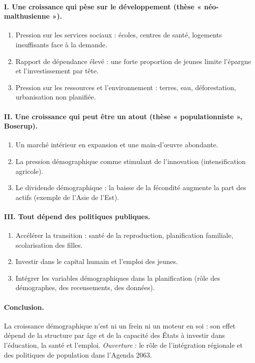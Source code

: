 \documentclass[11pt,a4paper]{article}
\begin{document}
\paragraph{I. Une croissance qui pèse sur le développement (thèse « néo-malthusienne »).}
\begin{enumerate}[label=\Alph*.]
  \item Pression sur les services sociaux : écoles, centres de santé, logements insuffisants face à la demande.
  \item Rapport de dépendance élevé : une forte proportion de jeunes limite l'épargne et l'investissement par tête.
  \item Pression sur les ressources et l'environnement : terres, eau, déforestation, urbanisation non planifiée.
\end{enumerate}

\paragraph{II. Une croissance qui peut être un atout (thèse « populationniste », Boserup).}
\begin{enumerate}[label=\Alph*.]
  \item Un marché intérieur en expansion et une main-d'{\oe}uvre abondante.
  \item La pression démographique comme stimulant de l'innovation (intensification agricole).
  \item Le dividende démographique : la baisse de la fécondité augmente la part des actifs (exemple de l'Asie de l'Est).
\end{enumerate}

\paragraph{III. Tout dépend des politiques publiques.}
\begin{enumerate}[label=\Alph*.]
  \item Accélérer la transition : santé de la reproduction, planification familiale, scolarisation des filles.
  \item Investir dans le capital humain et l'emploi des jeunes.
  \item Intégrer les variables démographiques dans la planification (rôle des démographes, des recensements, des données).
\end{enumerate}

\paragraph{Conclusion.}
La croissance démographique n'est ni un frein ni un moteur en soi : son effet dépend de la structure
par âge et de la capacité des États à investir dans l'éducation, la santé et l'emploi.
\emph{Ouverture} : le rôle de l'intégration régionale et des politiques de population dans l'Agenda 2063.
\end{document}
